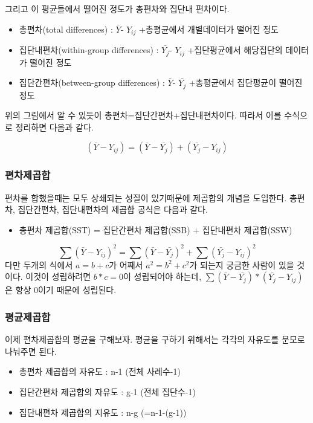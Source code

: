 \documentclass[
]{book}
\providecommand{\tightlist}{%
  \setlength{\itemsep}{0pt}\setlength{\parskip}{0pt}}
\begin{document}
그리고 이 평균들에서 떨어진 정도가 총편차와 집단내 편차이다.

\begin{itemize}
\item
  총편차(total differences) : \(\bar{Y}\)- \(Y_{ij}\)
  +총평균에서 개별데이터가 떨어진 정도
\item
  집단내편차(within-group differences) : \(\bar{Y_{j}}\)- \(Y_{ij}\)
  +집단평균에서 해당집단의 데이터가 떨어진 정도
\item
  집단간편차(between-group differences) : \(\bar{Y}\)- \(\bar{Y_{j}}\)
  +총평균에서 집단평균이 떨어진 정도
\end{itemize}

위의 그림에서 알 수 있듯이 총편차=집단간편차+집단내편차이다. 따라서 이를 수식으로 정리하면 다음과 같다.

\[ (\bar{Y}- Y_{ij}) = (\bar{Y}- \bar{Y_{j}}) + (\bar{Y_{j}}- Y_{ij})\]

\subsubsection{편차제곱합}\label{uxd3b8uxcc28uxc81cuxacf1uxd569}

편차를 합했을때는 모두 상쇄되는 성질이 있기때문에 제곱합의 개념을 도입한다. 총편차, 집단간편차, 집단내편차의 제곱합 공식은 다음과 같다.

\begin{itemize}
\tightlist
\item
  총편차 제곱합(SST) = 집단간편차 제곱합(SSB) + 집단내편차 제곱합(SSW)
\end{itemize}

\[ \sum(\bar{Y}- Y_{ij})^2 = \sum(\bar{Y}- \bar{Y_{j}})^2 + \sum(\bar{Y_{j}}- Y_{ij})^2\]
다만 두개의 식에서 \(a=b+c\)가 어째서 \(a^2=b^2+c^2\)가 되는지 궁금한 사람이 있을 것이다. 이것이 성립하려면 \(b*c=0\)이 성립되어야 하는데, \(\sum(\bar{Y}- \bar{Y_{j}})*(\bar{Y_{j}}- Y_{ij})\)은 항상 0이기 때문에 성립된다.

\subsubsection{평균제곱합}\label{uxd3c9uxade0uxc81cuxacf1uxd569}

이제 편차제곱합의 평균을 구해보자. 평균을 구하기 위해서는 각각의 자유도를 분모로 나눠주면 된다.

\begin{itemize}
\tightlist
\item
  총편차 제곱합의 자유도 : n-1 (전체 사례수-1)
\item
  집단간편차 제곱합의 자유도 : g-1 (전체 집단수-1)
\item
  집단내편차 제곱합의 지유도 : n-g (=n-1-(g-1))
\end{itemize}
\end{document}
